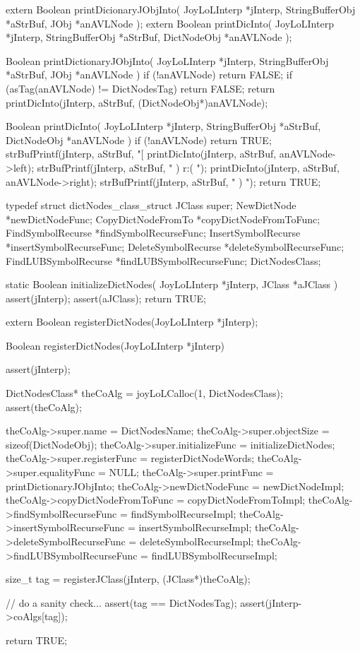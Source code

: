 \startCHeader
extern Boolean printDicionaryJObjInto(
  JoyLoLInterp    *jInterp,
  StringBufferObj *aStrBuf,
  JObj        *anAVLNode
);
extern Boolean printDicInto(
  JoyLoLInterp    *jInterp,
  StringBufferObj *aStrBuf,
  DictNodeObj         *anAVLNode
);
\stopCHeader
{}

\startCCode
Boolean printDictionaryJObjInto(
  JoyLoLInterp    *jInterp,
  StringBufferObj *aStrBuf,
  JObj        *anAVLNode
) {
  if (!anAVLNode) return FALSE;
  if (asTag(anAVLNode) != DictNodesTag) return FALSE;
  return printDicInto(jInterp, aStrBuf, (DictNodeObj*)anAVLNode);
}

Boolean printDicInto(
  JoyLoLInterp    *jInterp,
  StringBufferObj *aStrBuf,
  DictNodeObj         *anAVLNode
) {
  if (!anAVLNode) return TRUE;
  strBufPrintf(jInterp, aStrBuf, "[%
  printDicInto(jInterp, aStrBuf, anAVLNode->left);
  strBufPrintf(jInterp, aStrBuf, " ) r:( ");
  printDicInto(jInterp, aStrBuf, anAVLNode->right);
  strBufPrintf(jInterp, aStrBuf, " ) ");
  return TRUE;
}
\stopCCode

\startTestSuite[registerDictNodes]

\startCHeader
typedef struct dictNodes_class_struct {
  JClass super;
  NewDictNode          *newDictNodeFunc;
  CopyDictNodeFromTo   *copyDictNodeFromToFunc;
  FindSymbolRecurse    *findSymbolRecurseFunc;
  InsertSymbolRecurse  *insertSymbolRecurseFunc;
  DeleteSymbolRecurse  *deleteSymbolRecurseFunc;
  FindLUBSymbolRecurse *findLUBSymbolRecurseFunc;
} DictNodesClass;
\stopCHeader

\startCCode
static Boolean initializeDictNodes(
  JoyLoLInterp *jInterp,
  JClass   *aJClass
) {
  assert(jInterp);
  assert(aJClass);
  return TRUE;
}
\stopCCode

\startCHeader
extern Boolean registerDictNodes(JoyLoLInterp *jInterp);
\stopCHeader
{}

\startCCode
Boolean registerDictNodes(JoyLoLInterp *jInterp) {
  assert(jInterp);
  
  DictNodesClass* theCoAlg =
    joyLoLCalloc(1, DictNodesClass);
  assert(theCoAlg);
  
  theCoAlg->super.name             = DictNodesName;
  theCoAlg->super.objectSize       = sizeof(DictNodeObj);
  theCoAlg->super.initializeFunc   = initializeDictNodes;
  theCoAlg->super.registerFunc     = registerDictNodeWords;
  theCoAlg->super.equalityFunc     = NULL;
  theCoAlg->super.printFunc        = printDictionaryJObjInto;
  theCoAlg->newDictNodeFunc        = newDictNodeImpl;
  theCoAlg->copyDictNodeFromToFunc = copyDictNodeFromToImpl;
  theCoAlg->findSymbolRecurseFunc  = findSymbolRecurseImpl;
  theCoAlg->insertSymbolRecurseFunc =
    insertSymbolRecurseImpl;
  theCoAlg->deleteSymbolRecurseFunc =
    deleteSymbolRecurseImpl;
  theCoAlg->findLUBSymbolRecurseFunc =
    findLUBSymbolRecurseImpl;

  size_t tag =
    registerJClass(jInterp, (JClass*)theCoAlg);
  
  // do a sanity check...
  assert(tag == DictNodesTag);
  assert(jInterp->coAlgs[tag]);
    
  return TRUE;
}
\stopCCode


